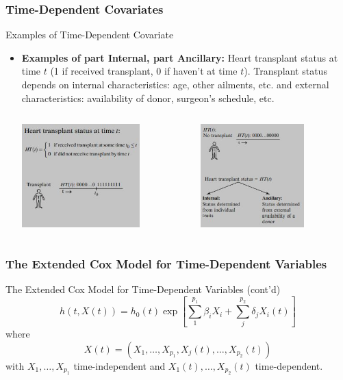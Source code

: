 \documentclass{beamer}
\theoremstyle{definition}
\begin{document}
\begin{frame}
\frametitle{Time-Dependent Covariates}
\begin{block}{Examples of Time-Dependent Covariate}
\begin{itemize}
\item \textbf{Examples of part Internal, part Ancillary:} Heart transplant status at time $t$ (1 if received transplant, 0 if haven't at time $t$). Transplant status depends on internal characteristics:  age, other ailments, etc. and external characteristics: availability of donor, surgeon's schedule, etc.
\begin{columns}
    \begin{column}{0.48\textwidth}
        \includegraphics[width =\textwidth, height=4cm]{CH6_HT.JPG}
    \end{column}
    \hspace{-10pt}
    \begin{column}{0.48\textwidth}
         \includegraphics[width =\textwidth, height=4cm]{CH6_HTS2.JPG}
    \end{column}
\end{columns}
\end{itemize}
\end{block}
\end{frame}

\begin{frame}
\frametitle{The Extended Cox Model for Time-Dependent Variables}
\begin{block}{The Extended Cox Model for Time-Dependent Variables (cont'd)}
\[
h(t,X(t)) = h_0(t) \exp\left[\sum_1^{p_1} \beta_i X_i + \sum_j^{p_2} \delta_j X_i(t)\right]
\]
where
\[
X(t)=(X_1,\ldots,X_{p_1},X_j(t),\ldots,X_{p_2}(t))
\]
with $X_1,\ldots,X_{p_1}$ time-independent and $X_1(t),\ldots,X_{p_2}(t)$ time-dependent.
\end{block}
\end{frame}
\end{document}
